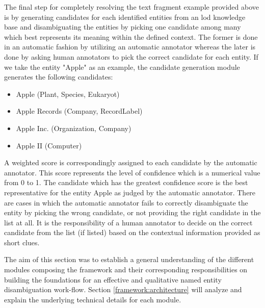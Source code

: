 The final step for completely resolving the text fragment example provided above is by generating candidates for each identified entities from an \ac{lod} knowledge base and disambiguating the entities by picking one candidate among many which best represents its meaning within the defined context. The former is done in an automatic fashion by utilizing an automatic annotator whereas the later is done by asking human annotators to pick the correct candidate for each entity. If we take the entity "Apple" as an example, the candidate generation module generates the following candidates: 
\begin{itemize}
    \item Apple (Plant, Species, Eukaryot)
    \item Apple Records (Company, RecordLabel)
    \item Apple Inc. (Organization, Company)
    \item Apple II (Computer)
\end{itemize}

A weighted score is correspondingly assigned to each candidate by the automatic annotator. This score represents the level of confidence which is a numerical value from 0 to 1. The candidate which has the greatest confidence score is the best representative for the entity Apple as judged by the automatic annotator. There are cases in which the automatic annotator fails to correctly disambiguate the entity by picking the wrong candidate, or not providing the right candidate in the list at all. It is the responsibility of a human annotator to decide on the correct candidate from the list (if listed) based on the contextual information provided as short clues.

The aim of this section was to establish a general understanding of the different modules composing the framework and their corresponding responsibilities on building the foundations for an effective and qualitative named entity disambiguation work-flow. Section \ref{framework:architecture} will analyze and explain the underlying technical details for each module. 
\newpage